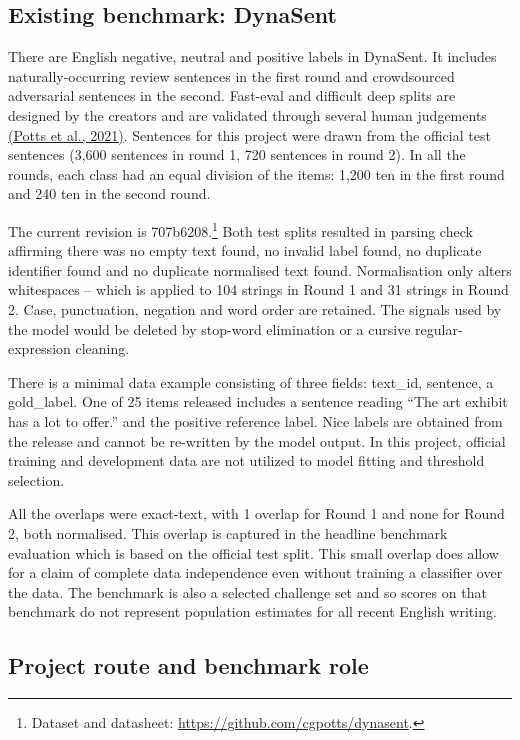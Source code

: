 \documentclass[11pt]{article}
\begin{document}
\subsection{Existing benchmark: DynaSent}

There are English negative, neutral and positive labels in DynaSent. It includes naturally-occurring review sentences in the first round and crowdsourced adversarial sentences in the second. Fast-eval and difficult deep splits are designed by the creators and are validated through several human judgements \hyperlink{ref_potts2021dynasent}{(Potts et al., 2021)}. Sentences for this project were drawn from the official test sentences (3,600 sentences in round 1, 720 sentences in round 2). In all the rounds, each class had an equal division of the items: 1,200 ten in the first round and 240 ten in the second round.


The current revision is 707b6208.\footnote{Dataset and datasheet: \url{https://github.com/cgpotts/dynasent}.} Both test splits resulted in parsing check affirming there was no empty text found, no invalid label found, no duplicate identifier found and no duplicate normalised text found. Normalisation only alters whitespaces -- which is applied to 104 strings in Round 1 and 31 strings in Round 2. Case, punctuation, negation and word order are retained. The signals used by the model would be deleted by stop-word elimination or a cursive regular-expression cleaning.


There is a minimal data example consisting of three fields: text\_id, sentence, a gold\_label. One of 25 items released includes a sentence reading ``The art exhibit has a lot to offer.'' and the positive reference label. Nice labels are obtained from the release and cannot be re-written by the model output. In this project, official training and development data are not utilized to model fitting and threshold selection.


All the overlaps were exact-text, with 1 overlap for Round 1 and none for Round 2, both normalised. This overlap is captured in the headline benchmark evaluation which is based on the official test split. This small overlap does allow for a claim of complete data independence even without training a classifier over the data. The benchmark is also a selected challenge set and so scores on that benchmark do not represent population estimates for all recent English writing.


\subsection{Project route and benchmark role}
\end{document}
